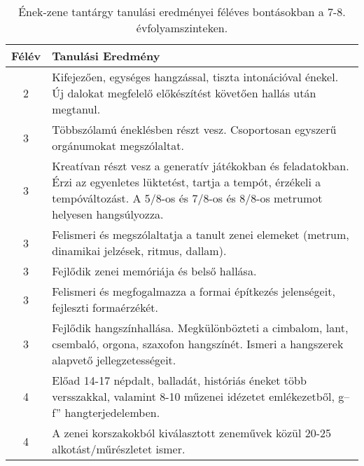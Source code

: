        
           \begin{longtable}{c | p{} }
            \caption[Ének-zene 7-8.]{Ének-zene tantárgy tanulási eredményei féléves bontásokban a 7-8. évfolyamszinteken. }  \\

            \textbf{Félév} & \textbf{Tanulási Eredmény} \\
            \hline
            \endhead
                                
                                          2 &  Kifejezően, egységes hangzással, tiszta intonációval énekel. Új dalokat megfelelő előkészítést követően hallás után megtanul. \\ \hline
                                      
                                
                                          3 &  Többszólamú éneklésben részt vesz. Csoportosan egyszerű orgánumokat megszólaltat. \\ \hline
                                          3 &  Kreatívan  részt vesz a generatív játékokban és feladatokban. Érzi az egyenletes lüktetést, tartja a tempót, érzékeli a tempóváltozást. A 5/8-os és 7/8-os és 8/8-os metrumot helyesen hangsúlyozza. \\ \hline
                                          3 &  Felismeri és megszólaltatja a tanult zenei elemeket (metrum, dinamikai jelzések, ritmus, dallam). \\ \hline
                                          3 &  Fejlődik zenei memóriája és belső hallása. \\ \hline
                                          3 &  Felismeri és megfogalmazza a formai építkezés jelenségeit, fejleszti formaérzékét. \\ \hline
                                          3 &  Fejlődik hangszínhallása. Megkülönbözteti a cimbalom, lant, csembaló, orgona, szaxofon hangszínét. Ismeri a hangszerek alapvető jellegzetességeit. \\ \hline
                                      
                                
                                          4 &  Előad 14-17 népdalt, balladát, históriás éneket több versszakkal, valamint 8-10 műzenei idézetet emlékezetből, g–f” hangterjedelemben. \\ \hline
                                          4 &  A zenei korszakokból kiválasztott zeneművek közül 20-25 alkotást/műrészletet ismer. \\ \hline
                                      
                        \end{longtable}
            \clearpage


